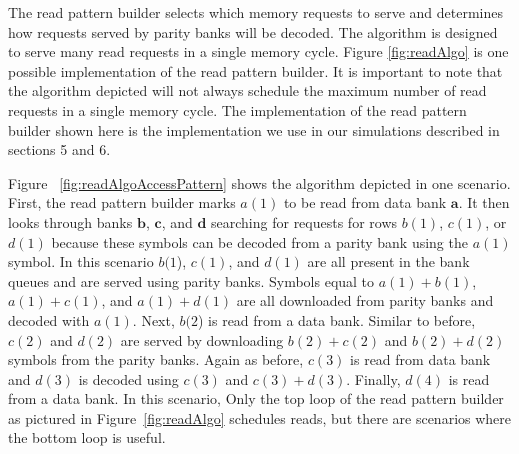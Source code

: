 The read pattern builder selects which memory requests to serve and determines how requests served by parity banks will be decoded. The algorithm is designed to serve many read requests in a single memory cycle. Figure \ref{fig:readAlgo} is one possible implementation of the read pattern builder. It is important to note that the algorithm depicted will not always schedule the maximum number of read requests in a single memory cycle. The implementation of the read pattern builder shown here is the implementation we use in our simulations described in sections 5 and 6. 

Figure ~\ref{fig:readAlgoAccessPattern} shows the algorithm depicted in one scenario. First, the read pattern builder marks $a(1)$ to be read from data bank $\mathbf{a}$. It then looks through banks $\mathbf{b}$, $\mathbf{c}$, and $\mathbf{d}$ searching for requests for rows $b(1)$, $c(1)$, or $d(1)$ because these symbols can be decoded from a parity bank using the $a(1)$ symbol. In this scenario $b(1$), $c(1)$, and $d(1)$ are all present in the bank queues and are served using parity banks. Symbols equal to  $a(1) + b(1)$, $a(1) + c(1)$, and $a(1) + d(1)$ are all downloaded from parity banks and decoded with $a(1)$. Next, $b(2$) is read from a data bank. Similar to before, $c(2)$ and $d(2)$ are served by downloading $b(2) + c(2)$ and $b(2) + d(2)$ symbols from the parity banks. Again as before, $c(3)$ is read from data bank and $d(3)$ is decoded using $c(3)$ and $c(3) + d(3)$. Finally, $d(4)$ is read from a data bank. In this scenario, Only the top loop of the read pattern builder as pictured in Figure~\ref{fig:readAlgo} schedules reads, but there are scenarios where the bottom loop is useful. 


